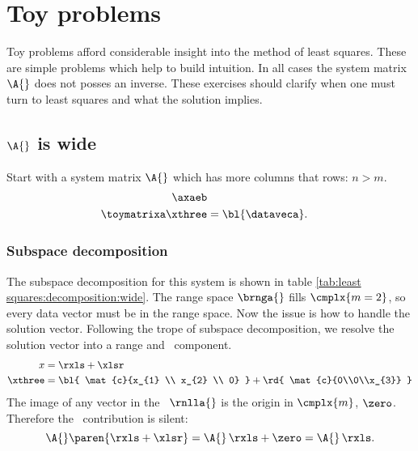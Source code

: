 \section{Toy problems}

Toy problems afford considerable insight into the method of least squares. These are simple problems which help to build intuition. In all cases the system matrix $\A{}$ does not posses an inverse. These exercises should clarify when one must turn to least squares and what the solution implies.

\subsection{$\A{}$ is wide}
Start with a system matrix $\A{}$ which has more columns that rows: $n>m$.
\begin{equation}
  \begin{split}
    \axaeb \\
    \toymatrixa \xthree &= {\bl{ \dataveca }}.
  \label{eqn:toy:system:wide}
 \end{split}
\end{equation}

\subsubsection{Subspace decomposition}
The subspace decomposition for this system is shown in table \eqref{tab:least squares:decomposition:wide}.
The range space $\brnga{}$ fills $\cmplx{m=2}$, so every data vector must be in the range space. Now the issue is how to handle the solution vector.
Following the trope of subspace decomposition, we resolve the solution vector into a range and \ns \ component.
%
\begin{equation}
  \begin{split}
    x &= \rxls +  \xlsr \\
    \xthree &= {\bl{ \mat{c}{x_{1} \\ x_{2} \\ 0} }} + {\rd{ \mat{c}{0\\0\\x_{3}} }}
  \end{split}
\end{equation}
%
The image of any vector in the \ns\ $\rnlla{}$ is the origin in $\cmplx{m}$, $\zero$. Therefore the \ns \ contribution is silent:
\begin{equation}
  \A{} \paren{\rxls +  \xlsr} = \A{}\, \rxls + \zero = \A{}\, \rxls.
\end{equation}
%

